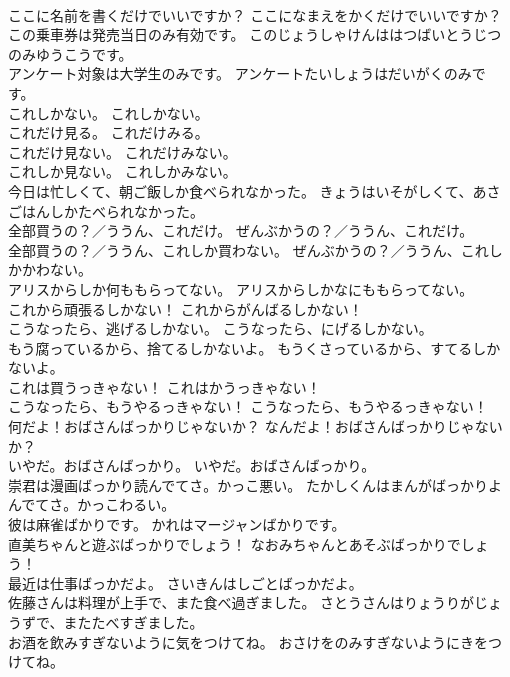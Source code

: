 \documentclass[8pt]{extreport}
\begin{document}
\begin{CJK}{UTF8}{min}
\\	ここに名前を書くだけでいいですか？	ここになまえをかくだけでいいですか？ 
\\	この乗車券は発売当日のみ有効です。	このじょうしゃけんははつばいとうじつのみゆうこうです。 
\\	アンケート対象は大学生のみです。	アンケートたいしょうはだいがくのみです。 
\\	これしかない。	これしかない。 
\\	これだけ見る。	これだけみる。 
\\	これだけ見ない。	これだけみない。 
\\	これしか見ない。	これしかみない。 
\\	今日は忙しくて、朝ご飯しか食べられなかった。	きょうはいそがしくて、あさごはんしかたべられなかった。 
\\	全部買うの？／ううん、これだけ。	ぜんぶかうの？／ううん、これだけ。 
\\	全部買うの？／ううん、これしか買わない。	ぜんぶかうの？／ううん、これしかかわない。 
\\	アリスからしか何ももらってない。	アリスからしかなにももらってない。 
\\	これから頑張るしかない！	これからがんばるしかない！ 
\\	こうなったら、逃げるしかない。	こうなったら、にげるしかない。 
\\	もう腐っているから、捨てるしかないよ。	もうくさっているから、すてるしかないよ。 
\\	これは買うっきゃない！	これはかうっきゃない！ 
\\	こうなったら、もうやるっきゃない！	こうなったら、もうやるっきゃない！ 
\\	何だよ！おばさんばっかりじゃないか？	なんだよ！おばさんばっかりじゃないか？ 
\\	いやだ。おばさんばっかり。	いやだ。おばさんばっかり。 
\\	崇君は漫画ばっかり読んでてさ。かっこ悪い。	たかしくんはまんがばっかりよんでてさ。かっこわるい。 
\\	彼は麻雀ばかりです。	かれはマージャンばかりです。 
\\	直美ちゃんと遊ぶばっかりでしょう！	なおみちゃんとあそぶばっかりでしょう！ 
\\	最近は仕事ばっかだよ。	さいきんはしごとばっかだよ。 
\\	佐藤さんは料理が上手で、また食べ過ぎました。	さとうさんはりょうりがじょうずで、またたべすぎました。 
\\	お酒を飲みすぎないように気をつけてね。	おさけをのみすぎないようにきをつけてね。 

\end{CJK}
\end{document}
